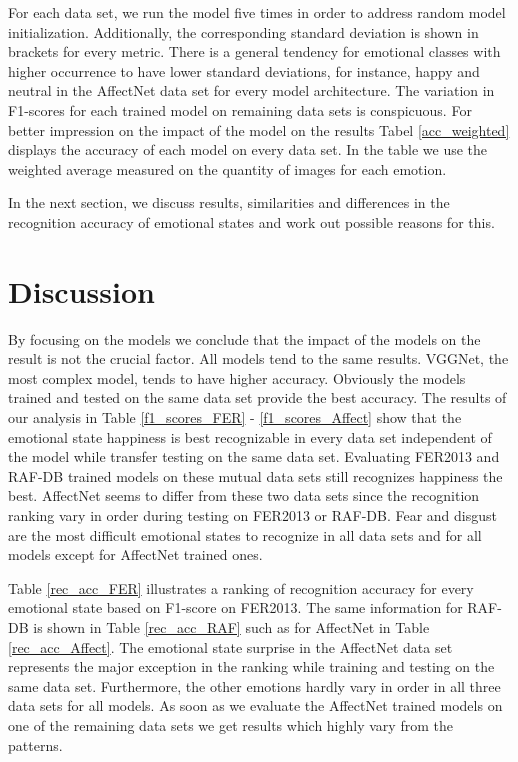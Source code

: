 \documentclass[a4paper, conference]{IEEEtran}
\begin{document}
For each data set, we run the model five times in order to address random model initialization. Additionally, the corresponding standard deviation is shown in brackets for every metric. There is a general tendency for emotional classes with higher occurrence to have lower standard deviations, for instance, happy and neutral in the AffectNet data set for every model architecture. The variation in F1-scores for each trained model on remaining data sets is conspicuous. For better impression on the impact of the model on the results Tabel \ref{acc_weighted} displays the accuracy of each model on every data set. In the table we use the weighted average measured on the quantity of images for each emotion.

In the next section, we discuss results, similarities and differences in the recognition accuracy of emotional states and work out possible reasons for this.%

\section{Discussion}
\label{discuss}

By focusing on the models we conclude that the impact of the models on the result is not the crucial factor. All models tend to the same results. VGGNet, the most complex model, tends to have higher accuracy. Obviously the models trained and tested on the same data set provide the best accuracy.
The results of our analysis in Table \ref{f1_scores_FER} - \ref{f1_scores_Affect} show that the emotional state happiness is best recognizable in every data set independent of the model while transfer testing on the same data set. Evaluating FER2013 and RAF-DB trained models on these mutual data sets still recognizes happiness the best. AffectNet seems to differ from these two data sets since the recognition ranking vary in order during testing on FER2013 or RAF-DB. Fear and disgust are the most difficult emotional states to recognize in all data sets and for all models except for AffectNet trained ones.

Table \ref{rec_acc_FER} illustrates a ranking of recognition accuracy for every emotional state based on F1-score on FER2013. The same information for RAF-DB is shown in Table \ref{rec_acc_RAF} such as for AffectNet in Table \ref{rec_acc_Affect}. The emotional state surprise in the AffectNet data set represents the major exception in the ranking while training and testing on the same data set. Furthermore, the other emotions hardly vary in order in all three data sets for all models. As soon as we evaluate the AffectNet trained models on one of the remaining data sets we get results which highly vary from the patterns.
\end{document}
